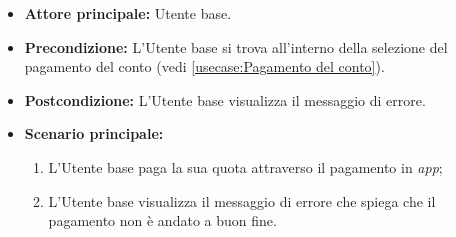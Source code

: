\label{usecase:Visualizzazione errore pagamento}
\begin{itemize}
	\item \textbf{Attore principale:} Utente base.

	\item \textbf{Precondizione:}
	      L'Utente base si trova all'interno della selezione del pagamento del conto (vedi \autoref{usecase:Pagamento del conto}).

	\item \textbf{Postcondizione:}
	      L'Utente base visualizza il messaggio di errore.

	\item \textbf{Scenario principale:}
	      \begin{enumerate}
		      \item L'Utente base paga la sua quota attraverso il pagamento in \textit{app};
		      \item L'Utente base visualizza il messaggio di errore che spiega che il pagamento non è andato a buon fine.
	      \end{enumerate}
\end{itemize}
